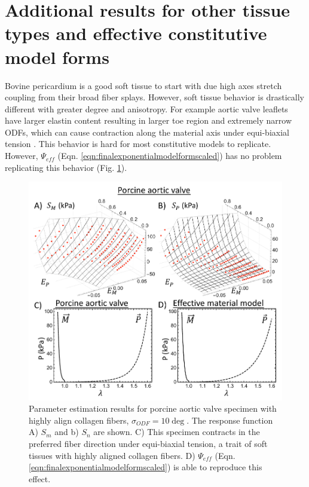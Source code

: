 \section{Additional results for other tissue types and effective constitutive model forms} \label{sec:otherresults}

	Bovine pericardium is a good soft tissue to start with due high axes stretch coupling from their broad fiber splays. However, soft tissue behavior is drastically different with greater degree and anisotropy. For example aortic valve leaflets have larger elastin content resulting in larger toe region and extremely narrow ODFs, which can cause contraction along the material axis under equi-biaxial tension \cite{billiar_biaxial_2000b}. This behavior is hard for most constitutive models to replicate. However, $\Psi_{eff}$ (Eqn. \ref{eqn:finalexponentialmodelformscaled}) has no problem replicating this behavior (Fig. \ref{fig:aorticfit}). 

\begin{figure}
\centering
\includegraphics[width=6.5in]{Figures/aorticfit}
\caption{Parameter estimation results for porcine aortic valve specimen with highly align collagen fibers, $\sigma_{ODF} =10\deg$. The response function A) $S_m$ and b) $S_n$ are shown. C) This specimen contracts in the preferred fiber direction under equi-biaxial tension, a trait of soft tissues with highly aligned collagen fibers. D) $\Psi_{eff}$ (Eqn. \ref{eqn:finalexponentialmodelformscaled}) is able to reproduce this effect.}
\label{fig:aorticfit}
\end{figure} 
    
